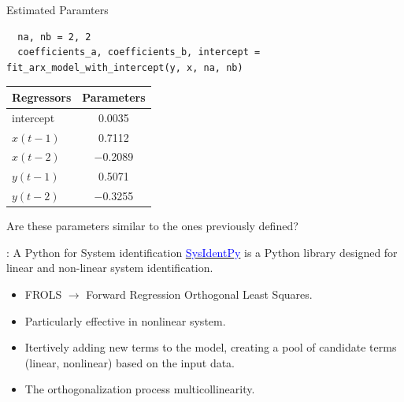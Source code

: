 \documentclass[aspectratio=169,hyperref={pdfpagelabels=false}]{beamer}
\begin{document}
\begin{frame}[fragile]{\small{Estimated Paramters}}
  \begin{verbatim}
  na, nb = 2, 2
  coefficients_a, coefficients_b, intercept = fit_arx_model_with_intercept(y, x, na, nb)
  \end{verbatim}

  \begin{table}
    \centering
  \begin{tabular}{|l|c|}
      \toprule
      \textbf{Regressors} & \textbf{Parameters} \\
      \midrule
      intercept        & \num{0.0035} \\
      $x(t-1)$ & \num{0.7112} \\
      $x(t-2)$ & \num{-0.2089} \\
      $y(t-1)$ & \num{0.5071} \\
      $y(t-2)$ & \num{-0.3255} \\
      \bottomrule
    \end{tabular}
  \end{table}
  \vspace{1em}\pause
  Are these parameters similar to the ones previously defined?
\end{frame}

\begin{frame}[fragile]{: A Python for System identification}
  \href{https://github.com/wilsonrljr/sysidentpy}{\textcolor{blue}{SysIdentPy}} is a Python library designed for linear and non-linear system identification.
\begin{itemize}
  \item FROLS $\rightarrow$ Forward Regression Orthogonal Least Squares.
  \item Particularly effective in nonlinear system. 
  \item Itertively adding new terms to the model, creating a pool of candidate terms (linear, nonlinear) based on the input data.
  \item The orthogonalization process multicollinearity.
\end{itemize}
\end{frame}
\end{document}
